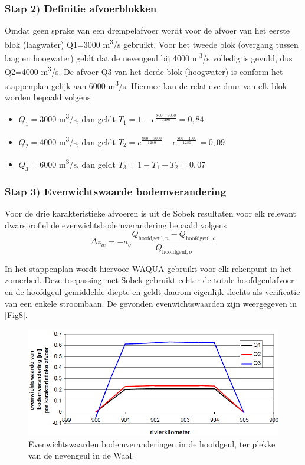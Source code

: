 \subsubsection*{Stap 2) Definitie afvoerblokken}

Omdat geen sprake van een drempelafvoer wordt voor de afvoer van het eerste blok (laagwater) Q1=3000 m\textsuperscript{3}/s gebruikt.
Voor het tweede blok (overgang tussen laag en hoogwater) geldt dat de nevengeul bij 4000 m\textsuperscript{3}/s volledig is gevuld, dus Q2=4000 m\textsuperscript{3}/s.
De afvoer Q3 van het derde blok (hoogwater) is conform het stappenplan gelijk aan 6000 m\textsuperscript{3}/s.
Hiermee kan de relatieve duur van elk blok worden bepaald volgens

\begin{itemize}
\item $Q_1=3000$ m\textsuperscript{3}/s, dan geldt $T_1 = 1-e^{\frac{800-3000}{1280}} = 0,84$
\item $Q_2=4000$ m\textsuperscript{3}/s, dan geldt $T_2 = e^{\frac{800-3000}{1280}} - e^{\frac{800-4000}{1280}} = 0,09$
\item $Q_3=6000$ m\textsuperscript{3}/s, dan geldt $T_3 = 1-T_1-T_2 = 0,07$
\end{itemize}

\subsubsection*{Stap 3) Evenwichtswaarde bodemverandering}

Voor de drie karakteristieke afvoeren is uit de Sobek resultaten voor elk relevant dwarsprofiel de evenwichtsbodemverandering bepaald volgens
%
\begin{equation}
\Delta z_{ie} = -a_o \frac{Q_{\text{hoofdgeul},n} - Q_{\text{hoofdgeul},o}}{Q_{\text{hoofdgeul},o}}
\end{equation}

\Note In het stappenplan wordt hiervoor WAQUA gebruikt voor elk rekenpunt in het zomerbed.
Deze toepassing met Sobek gebruikt echter de totale hoofdgeulafvoer en de hoofdgeul-gemiddelde diepte en geldt daarom eigenlijk slechts als verificatie van een enkele stroombaan.
De gevonden evenwichtswaarden zijn weergegeven in \autoref{Fig8}.

\begin{figure}
\includegraphics[width=\columnwidth]{figures/Fig8.png}
\caption{Evenwichtswaarden bodemveranderingen in de hoofdgeul, ter plekke van de nevengeul in de Waal.}
\label{Fig8}
\end{figure}

